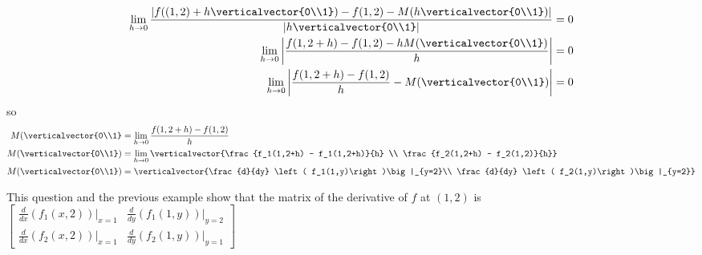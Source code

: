 \documentclass{ximera}
\begin{document}
\begin{free-response}

 \begin{align*}
 	  \lim_{h \to 0} \frac{\left|f((1,2)+h\verticalvector{0\\1}) - f(1,2) - M(h\verticalvector{0\\1})\right|}{\left|h \verticalvector{0\\1}\right|} &= 0\\
	  \lim_{h \to 0}\left| \frac{f(1,2+h) - f(1,2) - hM(\verticalvector{0\\1})}{h} \right| &= 0\\
	  \lim_{h \to 0}\left| \frac{f(1,2+h) - f(1,2)}{h} -M(\verticalvector{0\\1})\right| &= 0
	  \end{align*}
	  so
	  \begin{align*}
	  M(\verticalvector{0\\1} &= \lim_{ h \to 0 } \frac{f(1,2+h) - f(1,2)}{h}\\
	  M(\verticalvector{0\\1}) &= \lim_{ h \to 0 } \verticalvector{\frac{f_1(1,2+h) - f_1(1,2+h)}{h} \\ \frac{f_2(1,2+h) - f_2(1,2)}{h}}\\
	  M(\verticalvector{0\\1}) &= \verticalvector{\frac{d}{dy} \left( f_1(1,y)\right)\big|_{y=2}\\ \frac{d}{dy} \left( f_2(1,y)\right)\big|_{y=2}}
	 \end{align*}
\end{free-response}

This question and the previous example show that the matrix of the derivative of $f$ at $(1,2)$ is 
\(
\begin{bmatrix} \frac{d}{dx}(f_1(x,2))\big|_{x=1} & \frac{d}{dy}(f_1(1,y))\big|_{y=2}
\\ 
\frac{d}{dx}(f_2(x,2))\big|_{x=1} & \frac{d}{dy}(f_2(1,y))\big|_{y=1}\end{bmatrix}
\)
\end{document}
